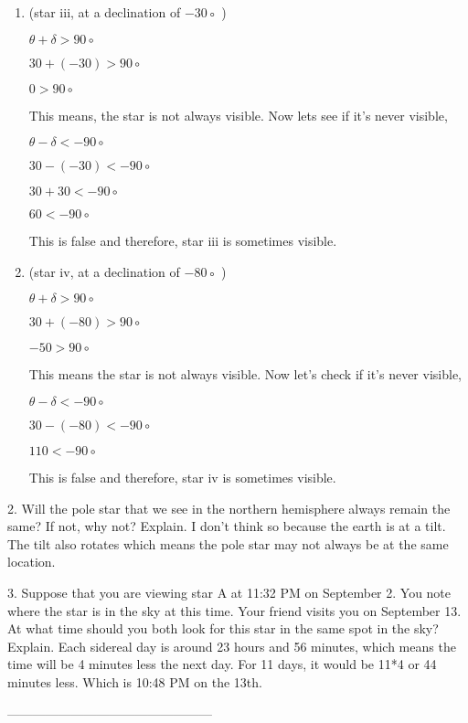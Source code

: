 \documentclass[12pt]{article}
\begin{document}
\begin{enumerate}
\begin{enumerate}
        \item (star iii, at a declination of $-30$◦ )
        \centerline{$\theta + \delta > 90\circ$}
        \centerline{$30 + (-30) > 90\circ$}
        \centerline{$ 0 > 90\circ$}
        This means, the star is not always visible.
        Now lets see if it's never visible,
        \centerline{$\theta - \delta < -90\circ$}
        \centerline{$30 - (-30) < -90\circ$}
        \centerline{$30 + 30 < -90\circ$}
        \centerline{$60 < -90\circ$}
        This is false and therefore, star iii is sometimes visible.

        \item (star iv, at a declination of $-80$◦ )
        \centerline{$\theta + \delta > 90\circ$}
        \centerline{$ 30 + (-80) > 90\circ$}
        \centerline{$ -50 > 90\circ$}
        This means the star is not always visible.
        Now let's check if it's never visible,
        \centerline{$\theta - \delta < -90\circ$}
        \centerline{$30 - (-80) < -90\circ$}
        \centerline{$110 < -90\circ$}
        This is false and therefore, star iv is sometimes visible.


\end{enumerate}

2. Will the pole star that we see in the northern hemisphere always remain the same? If not, why not? Explain.\newline\newline
        I don't think so because the earth is at a tilt. The tilt also rotates which means the pole star may not always be at the same location.

3. Suppose that you are viewing star A at 11:32 PM on September 2. You note where the star is in the sky at this time. Your friend visits you on September 13. At what time should you both look for this star in the same spot in the sky? Explain.\newline\newline
        Each sidereal day is around 23 hours and 56 minutes, which means the time will be 4 minutes less the next day. For 11 days, it would be 11*4 or 44 minutes less. Which is 10:48 PM on the 13th.


\end{enumerate}
————————————————
\end{document}
